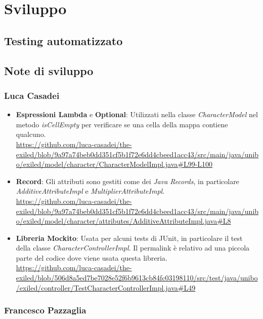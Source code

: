 \documentclass[a4paper,12pt]{report}
\begin{document}
\chapter{Sviluppo}

\section{Testing automatizzato}
\section{Note di sviluppo}

\subsection{Luca Casadei}
\begin{itemize}
	\item \textbf{Espressioni Lambda} e \textbf{Optional}: Utilizzati nella classe \textit{CharacterModel} nel metodo \textit{isCellEmpty} per verificare se una cella della mappa contiene qualcuno.\\
	\url{https://github.com/luca-casadei/the-exiled/blob/9a97a74beb0dd351cf5b1f72e6dd4cbeed1acc43/src/main/java/unibo/exiled/model/character/CharacterModelImpl.java#L99-L100}
	\item \textbf{Record}: Gli attributi sono gestiti come dei \textit{Java Records}, in particolare \textit{AdditiveAttributeImpl} e \textit{MultiplierAttributeImpl}.\\
	\url{https://github.com/luca-casadei/the-exiled/blob/9a97a74beb0dd351cf5b1f72e6dd4cbeed1acc43/src/main/java/unibo/exiled/model/character/attributes/AdditiveAttributeImpl.java#L8}
	\item \textbf{Libreria Mockito}: Usata per alcuni tests di JUnit, in particolare il test della classe \textit{CharacterControllerImpl}. Il permalink è relativo ad una piccola parte del codice dove viene usata questa libreria.\\
	\url{https://github.com/luca-casadei/the-exiled/blob/506d8a5ed7be7028e52f6b9613cb84fc03198110/src/test/java/unibo/exiled/controller/TestCharacterControllerImpl.java#L49}
\end{itemize}

\subsection{Francesco Pazzaglia}
\end{document}
